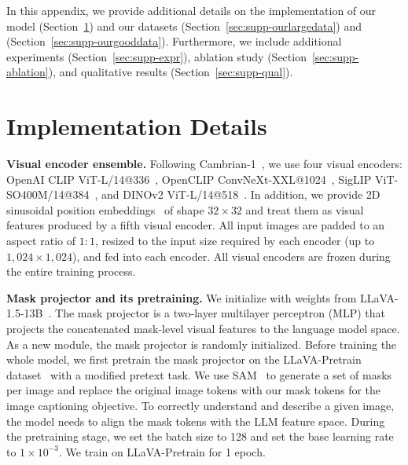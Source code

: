 \clearpage
\appendix
\setcounter{section}{0}
\setcounter{figure}{0}
\setcounter{table}{0}
\renewcommand{\thesection}{\Alph{section}}
\renewcommand{\thefigure}{\Alph{figure}}
\renewcommand{\thetable}{\Alph{table}}

\noindent In this appendix, we provide additional details on the implementation of our model \ourmodel (Section~\ref{sec:supp-impl}) and our datasets \ourlargedata (Section~\ref{sec:supp-ourlargedata}) and \ourgooddata (Section~\ref{sec:supp-ourgooddata}). Furthermore, we include additional experiments (Section~\ref{sec:supp-expr}), ablation study (Section~\ref{sec:supp-ablation}), and qualitative results (Section~\ref{sec:supp-qual}).

\section{Implementation Details}
\label{sec:supp-impl}
\noindent\textbf{Visual encoder ensemble.} Following Cambrian-1~\cite{tong2024cambrian}, we use four visual encoders: OpenAI CLIP ViT-L/14@336~\cite{radford2021learning}, OpenCLIP ConvNeXt-XXL@1024~\cite{liu2022convnet, cherti2023reproducible}, SigLIP ViT-SO400M/14@384~\cite{zhai2023sigmoid}, and DINOv2 ViT-L/14@518~\cite{oquab2023dinov2}. In addition, we provide 2D sinusoidal position embeddings~\cite{dosovitskiy2021image} of shape $32\times 32$ and treat them as visual features produced by a fifth visual encoder. All input images are padded to an aspect ratio of $1:1$, resized to the input size required by each encoder (up to $1,024 \times 1,024$), and fed into each encoder. All visual encoders are frozen during the entire training process.

\noindent\textbf{Mask projector and its pretraining.} We initialize \ourmodel with weights from LLaVA-1.5-13B~\cite{liu2024improved}. The mask projector is a two-layer multilayer perceptron (MLP) that projects the concatenated mask-level visual features to the language model space. As a new module, the mask projector is randomly initialized. Before training the whole \ourmodel model, we first pretrain the mask projector on the LLaVA-Pretrain dataset~\cite{liu2023visual, liu2024improved} with a modified pretext task. We use SAM~\cite{kirillov2023segment} to generate a set of masks per image and replace the original image tokens with our mask tokens for the image captioning objective. To correctly understand and describe a given image, the model needs to align the mask tokens with the LLM feature space. During the pretraining stage, we set the batch size to 128 and set the base learning rate to $1\times 10^{-3}$. We train on LLaVA-Pretrain for 1 epoch.

